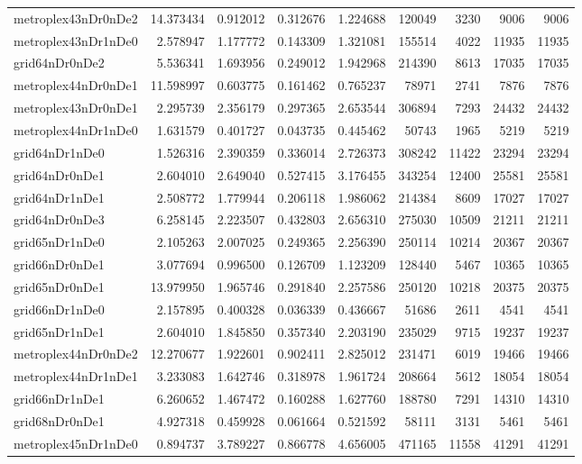 \begin{longtable}{|l|r|r|r|r|r|r|r|r|}
metroplex43nDr0nDe2 & 14.373434 & 0.912012 & 0.312676 & 1.224688 & 120049 & 3230 & 9006 & 9006 \\
metroplex43nDr1nDe0 & 2.578947 & 1.177772 & 0.143309 & 1.321081 & 155514 & 4022 & 11935 & 11935 \\
grid64nDr0nDe2 & 5.536341 & 1.693956 & 0.249012 & 1.942968 & 214390 & 8613 & 17035 & 17035 \\
metroplex44nDr0nDe1 & 11.598997 & 0.603775 & 0.161462 & 0.765237 & 78971 & 2741 & 7876 & 7876 \\
metroplex43nDr0nDe1 & 2.295739 & 2.356179 & 0.297365 & 2.653544 & 306894 & 7293 & 24432 & 24432 \\
metroplex44nDr1nDe0 & 1.631579 & 0.401727 & 0.043735 & 0.445462 & 50743 & 1965 & 5219 & 5219 \\
grid64nDr1nDe0 & 1.526316 & 2.390359 & 0.336014 & 2.726373 & 308242 & 11422 & 23294 & 23294 \\
grid64nDr0nDe1 & 2.604010 & 2.649040 & 0.527415 & 3.176455 & 343254 & 12400 & 25581 & 25581 \\
grid64nDr1nDe1 & 2.508772 & 1.779944 & 0.206118 & 1.986062 & 214384 & 8609 & 17027 & 17027 \\
grid64nDr0nDe3 & 6.258145 & 2.223507 & 0.432803 & 2.656310 & 275030 & 10509 & 21211 & 21211 \\
grid65nDr1nDe0 & 2.105263 & 2.007025 & 0.249365 & 2.256390 & 250114 & 10214 & 20367 & 20367 \\
grid66nDr0nDe1 & 3.077694 & 0.996500 & 0.126709 & 1.123209 & 128440 & 5467 & 10365 & 10365 \\
grid65nDr0nDe1 & 13.979950 & 1.965746 & 0.291840 & 2.257586 & 250120 & 10218 & 20375 & 20375 \\
grid66nDr1nDe0 & 2.157895 & 0.400328 & 0.036339 & 0.436667 & 51686 & 2611 & 4541 & 4541 \\
grid65nDr1nDe1 & 2.604010 & 1.845850 & 0.357340 & 2.203190 & 235029 & 9715 & 19237 & 19237 \\
metroplex44nDr0nDe2 & 12.270677 & 1.922601 & 0.902411 & 2.825012 & 231471 & 6019 & 19466 & 19466 \\
metroplex44nDr1nDe1 & 3.233083 & 1.642746 & 0.318978 & 1.961724 & 208664 & 5612 & 18054 & 18054 \\
grid66nDr1nDe1 & 6.260652 & 1.467472 & 0.160288 & 1.627760 & 188780 & 7291 & 14310 & 14310 \\
grid68nDr0nDe1 & 4.927318 & 0.459928 & 0.061664 & 0.521592 & 58111 & 3131 & 5461 & 5461 \\
metroplex45nDr1nDe0 & 0.894737 & 3.789227 & 0.866778 & 4.656005 & 471165 & 11558 & 41291 & 41291 \\

\end{longtable}
